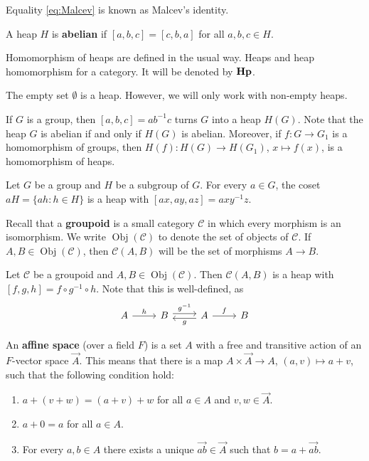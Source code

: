 \documentclass[graybox]{svmult}
\newcommand{\Obj}{\operatorname{Obj}}
\newcommand{\category}[1]{{\normalfont\textbf{#1}}}
\newcommand{\Hp}{\category{Hp}}
\begin{document}
Equality \eqref{eq:Malcev} is known as Malcev's identity. 

\begin{definition}
    A heap $H$ is \textbf{abelian} if $[a,b,c]=[c,b,a]$ for all $a,b,c\in H$. 
\end{definition}

Homomorphism of heaps are defined in the usual way. Heaps and heap homomorphism for a category. 
It will be denoted by $\Hp$. 

The empty set $\emptyset$ is a heap. However, we will only work with non-empty heaps. 

\begin{example}
\label{exa:H(G)}
    If $G$ is a group, then $[a,b,c]=ab^{-1}c$ turns $G$ into a heap $H(G)$. Note that
    the heap $G$ is abelian if and only if $H(G)$ is abelian. Moreover, 
    if $f\colon G\to G_1$ is a homomorphism of groups, then $H(f)\colon H(G)\to H(G_1)$, $x\mapsto f(x)$, is a 
    homomorphism of heaps. 
\end{example}

\begin{example}
    Let $G$ be a group and $H$ be a subgroup of $G$. For every $a\in G$, the coset
    $aH=\{ah:h\in H\}$ is a heap with
    $[ax,ay,az]=axy^{-1}z$. 
\end{example}

Recall that a \textbf{groupoid} is a small category $\mathcal{C}$ in which every morphism is an isomorphism. 
We write $\Obj(\mathcal{C})$ to denote the set of objects of $\mathcal{C}$. If $A,B\in\Obj(\mathcal{C})$, 
then $\mathcal{C}(A,B)$ will be the set of morphisms $A\to B$. 

\begin{example}
    Let $\mathcal{C}$ be a groupoid and $A,B\in\Obj(\mathcal{C})$. Then $\mathcal{C}(A,B)$ is a heap with
    $[f,g,h]=f\circ g^{-1}\circ h$. Note that this is well-defined, as
    \[
    \begin{tikzcd}
	A & B & A & B
	\arrow["h", from=1-1, to=1-2]
	\arrow["{g^{-1}}", shift left=1, from=1-2, to=1-3]
	\arrow["f", from=1-3, to=1-4]
	\arrow["g", shift left=1, from=1-3, to=1-2]
    \end{tikzcd}
    \]
\end{example}

An \textbf{affine space} (over a field $F$) 
is a set $A$ with a free and transitive action of an $F$-vector space $\overrightarrow{A}$. This means
that there is a map $A\times\overrightarrow{A}\to A$, $(a,v)\mapsto a+v$, such that 
the following condition hold:
\begin{enumerate}
    \item $a+(v+w)=(a+v)+w$ for all $a\in A$ and $v,w\in\overrightarrow{A}$.
    \item $a+0=a$ for all $a\in A$.
    \item For every $a,b\in A$ there exists a unique $\overrightarrow{ab}\in\overrightarrow{A}$ such that
    $b=a+\overrightarrow{ab}$.
\end{enumerate}
\end{document}
